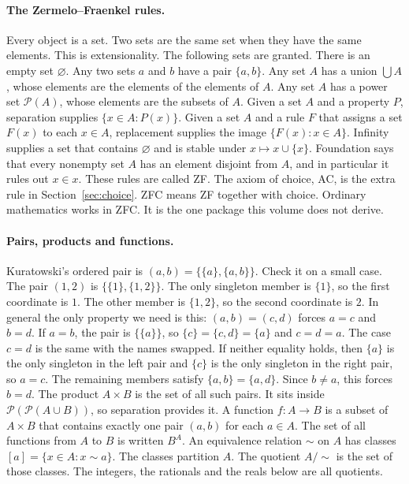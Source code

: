 \paragraph{The Zermelo--Fraenkel rules.}
Every object is a set. Two sets are the same set when they have the same elements. This is extensionality. The following sets are granted. There is an empty set $\varnothing$. Any two sets $a$ and $b$ have a pair $\{a,b\}$. Any set $A$ has a union $\bigcup A$, whose elements are the elements of the elements of $A$. Any set $A$ has a power set $\mathcal P(A)$, whose elements are the subsets of $A$. Given a set $A$ and a property $P$, separation supplies $\{x\in A:P(x)\}$. Given a set $A$ and a rule $F$ that assigns a set $F(x)$ to each $x\in A$, replacement supplies the image $\{F(x):x\in A\}$. Infinity supplies a set that contains $\varnothing$ and is stable under $x\mapsto x\cup\{x\}$. Foundation says that every nonempty set $A$ has an element disjoint from $A$, and in particular it rules out $x\in x$. These rules are called ZF. The axiom of choice, AC, is the extra rule in Section~\ref{sec:choice}. ZFC means ZF together with choice. Ordinary mathematics works in ZFC. It is the one package this volume does not derive.

\paragraph{Pairs, products and functions.}
Kuratowski's ordered pair is $(a,b)=\{\{a\},\{a,b\}\}$. Check it on a small case. The pair $(1,2)$ is $\{\{1\},\{1,2\}\}$. The only singleton member is $\{1\}$, so the first coordinate is $1$. The other member is $\{1,2\}$, so the second coordinate is $2$. In general the only property we need is this: $(a,b)=(c,d)$ forces $a=c$ and $b=d$. If $a=b$, the pair is $\{\{a\}\}$, so $\{c\}=\{c,d\}=\{a\}$ and $c=d=a$. The case $c=d$ is the same with the names swapped. If neither equality holds, then $\{a\}$ is the only singleton in the left pair and $\{c\}$ is the only singleton in the right pair, so $a=c$. The remaining members satisfy $\{a,b\}=\{a,d\}$. Since $b\ne a$, this forces $b=d$. The product $A\times B$ is the set of all such pairs. It sits inside $\mathcal P(\mathcal P(A\cup B))$, so separation provides it. A function $f:A\to B$ is a subset of $A\times B$ that contains exactly one pair $(a,b)$ for each $a\in A$. The set of all functions from $A$ to $B$ is written $B^A$. An equivalence relation $\sim$ on $A$ has classes $[a]=\{x\in A:x\sim a\}$. The classes partition $A$. The quotient $A/{\sim}$ is the set of those classes. The integers, the rationals and the reals below are all quotients.

